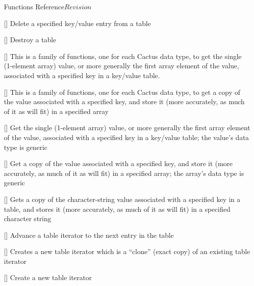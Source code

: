 \begin{cactuspart}{ Functions Reference}{}{$Revision$}
\begin{Lentry}
\item[\code{Util\_TableDeleteKey}]
     [\pageref{Util-TableDeleteKey}]
Delete a specified key/value entry from a table

\item[\code{Util\_TableDestroy}]
     [\pageref{Util-TableDestroy}]
Destroy a table

\item[\code{Util\_TableGet*}]
     [\pageref{Util-TableGet*}]
This is a family of functions, one for each Cactus data type,
to get the single (1-element array) value, or more generally the
first array element of the value, associated with a specified key
in a key/value table.

\item[\code{Util\_TableGet*Array}]
     [\pageref{Util-TableGet*Array}]
This is a family of functions, one for each Cactus data type,
to get a copy of the value associated with a specified key, and store
it (more accurately, as much of it as will fit) in a specified array

\item[\code{Util\_TableGetGeneric}]
     [\pageref{Util-TableGetGeneric}]
Get the single (1-element array) value, or more generally the
first array element of the value, associated with a specified key
in a key/value table; the value's data type is generic

\item[\code{Util\_TableGetGenericArray}]
     [\pageref{Util-TableGetGenericArray}]
Get a copy of the value associated with a specified key, and store
it (more accurately, as much of it as will fit) in a specified array;
the array's data type is generic

\item[\code{Util\_TableGetString}]
     [\pageref{Util-TableGetString}]
Gets a copy of the character-string value associated with a specified
key in a table, and stores it (more accurately, as much of it as will fit)
in a specified character string

\item[\code{Util\_TableItAdvance}]
     [\pageref{Util-TableItAdvance}]
Advance a table iterator to the next entry in the table

\item[\code{Util\_TableItClone}]
     [\pageref{Util-TableItClone}]
Creates a new table iterator which is a ``clone'' (exact copy) of an
existing table iterator

\item[\code{Util\_TableItCreate}]
     [\pageref{Util-TableItCreate}]
Create a new table iterator


\end{Lentry}
\end{cactuspart}
